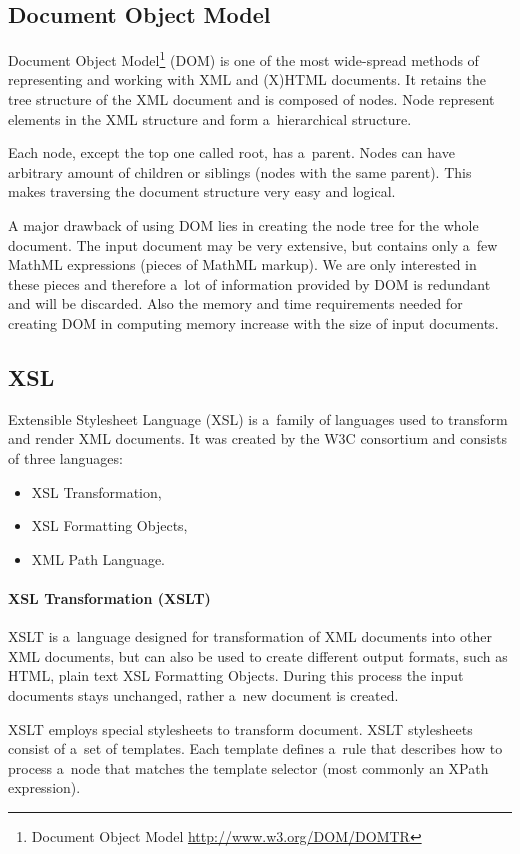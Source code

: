 \documentclass[11pt,oneside,final]{fithesis2}
\begin{document}
\iffalse
\subsection{Document Object Model}
Document Object Model\footnote{Document Object Model \url{http://www.w3.org/DOM/DOMTR}} (DOM) is one of the most wide-spread methods of representing and working with XML and (X)HTML documents. It retains the tree structure of the XML document and is composed of nodes. Node represent elements in the XML structure and form a~hierarchical structure. 

Each node, except the top one called root, has a~parent. Nodes can have arbitrary amount of children or siblings (nodes with the same parent). This makes traversing the document structure very easy and logical. 

A major drawback of using DOM lies in creating the node tree for the whole document. The input document may be very extensive, but contains only a~few MathML expressions (pieces of MathML markup). We are only interested in these pieces and therefore a~lot of information provided by DOM is redundant and will be discarded. Also the memory and time requirements needed for creating DOM in computing memory increase with the size of input documents.

\subsection{XSL}
\label{section:xsl}
Extensible Stylesheet Language (XSL) is a~family of languages used to transform and render XML documents. It was created by the W3C consortium and consists of three languages:
\begin{itemize}
\item XSL Transformation,
\item XSL Formatting Objects,
\item XML Path Language.
\end{itemize}

\paragraph*{XSL Transformation (XSLT)} 
XSLT is a~language designed for transformation of XML documents into other XML documents, but can also be used to create different output formats, such as HTML, plain text XSL Formatting Objects. During this process the input documents stays unchanged, rather a~new document is created. 

XSLT employs special stylesheets to transform document. XSLT stylesheets consist of a~set of templates. Each template defines a~rule that describes how to process a~node that matches the template selector (most commonly an XPath expression). 
\end{document}
